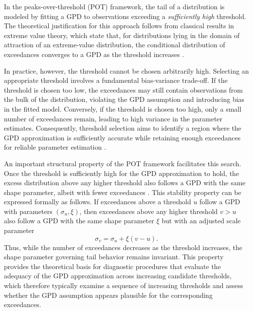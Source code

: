 In the peaks-over-threshold (POT) framework, the tail of a distribution is modeled by fitting a GPD to observations exceeding a \emph{sufficiently high} threshold. 
The theoretical justification for this approach follows from classical results in extreme value theory, which state that, for distributions lying in the domain of attraction of an extreme-value distribution, the conditional distribution of exceedances converges to a GPD as the threshold increases \citep{pickands1975statistical,park2016estimating}. 

In practice, however, the threshold cannot be chosen arbitrarily high. Selecting an appropriate threshold involves a fundamental bias-variance trade-off. If the threshold is chosen too low, the exceedances may still contain observations from the bulk of the distribution, violating the GPD assumption and introducing bias in the fitted model. Conversely, if the threshold is chosen too high, only a small number of exceedances remain, leading to high variance in the parameter estimates. Consequently, threshold selection aims to identify a region where the GPD approximation is sufficiently accurate while retaining enough exceedances for reliable parameter estimation \citep{knijnenburg2009fewer,scarrott2012review}.

An important structural property of the POT framework facilitates this search. Once the threshold is sufficiently high for the GPD approximation to hold, the excess distribution above any higher threshold also follows a GPD with the same shape parameter, albeit with fewer exceedances \citep{coles2001introduction,thompson2009automated}. This stability property can be expressed formally as follows. 
If exceedances above a threshold $u$ follow a GPD with parameters $(\sigma_u,\xi)$, then exceedances above any higher threshold $v>u$ also follow a GPD with the same shape parameter $\xi$ but with an adjusted scale parameter
\begin{equation}
\sigma_v = \sigma_u + \xi (v-u).
\end{equation}
Thus, while the number of exceedances decreases as the threshold increases, the shape parameter governing tail behavior remains invariant. 
This property provides the theoretical basis for diagnostic procedures that evaluate the adequacy of the GPD approximation across increasing candidate thresholds, which therefore typically examine a sequence of increasing thresholds and assess whether the GPD assumption appears plausible for the corresponding exceedances.

